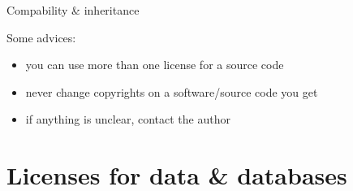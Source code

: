 \documentclass[10pt,xcolor=svgnames]{beamer}
\begin{document}
\begin{frame}[fragile]{Compability \& inheritance}
\begin{overprint}
\begin{figure}
\begin{tikzpicture}[>=latex, thick]
    \end{tikzpicture}
  \end{figure}
  
  \begin{block}{Some advices:}
    \begin{itemize}
      \item you can use more than one license for a source code
      \item never change copyrights on a software/source code you get
      \item if anything is unclear, contact the author
    \end{itemize}
  \end{block}
  \end{overprint}

\end{frame}

\section{Licenses for data \& databases}
\end{document}
